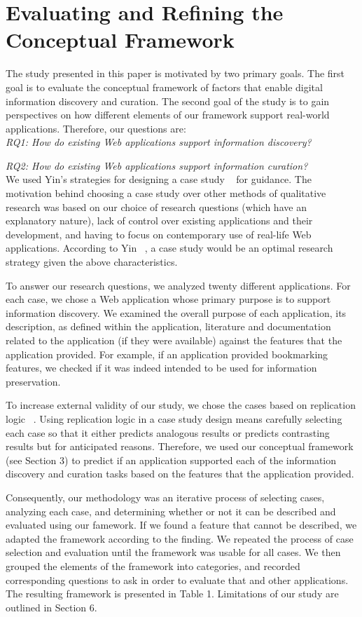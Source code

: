 \documentclass{casconpaper}
\begin{document}
{\section{Evaluating and Refining the Conceptual Framework}
The study presented in this paper is motivated by two primary goals. The first goal is to evaluate the conceptual framework of factors that enable digital information discovery and curation. The second goal of the study is to gain perspectives on how different elements of our framework support real-world applications. Therefore, our questions are:
\\

\emph{RQ1: How do existing Web applications support information discovery?}

\emph{RQ2: How do existing Web applications support information curation?}\\


We used Yin’s strategies for designing a case study ~\cite{yin} for guidance. The motivation behind choosing a case study over other methods of qualitative research was based on our choice of research questions (which have an explanatory nature), lack of control over existing applications and their development, and having to focus on contemporary use of real-life Web applications. According to Yin ~\cite{yin}, a case study would be an optimal research strategy given the above characteristics.

To answer our research questions, we analyzed twenty different applications. For each case, we chose a Web application whose primary purpose is to support information discovery. We examined the overall purpose of each application, its description, as defined within the application, literature and documentation related to the application (if they were available) against the features that the application provided. For example, if an application provided bookmarking features, we checked if it was indeed intended to be used for information preservation. 

To increase external validity of our study, we chose the cases based on replication logic ~\cite{yin}. Using replication logic in a case study design means carefully selecting each case so that it either predicts analogous results or predicts contrasting results but for anticipated reasons. Therefore, we used our conceptual framework (see Section 3) to predict if an application supported each of the information discovery and curation tasks based on the features that the application provided. 

Consequently, our methodology was an iterative process of selecting cases, analyzing each case, and determining whether or not it can be described and evaluated using our famework. If we found a feature that cannot be described, we adapted the framework according to the finding. We repeated the process of case selection and evaluation until the framework was usable for all cases. We then grouped the elements of the framework into categories, and recorded corresponding questions to ask in order to evaluate that and other applications. The resulting framework is presented in Table 1. Limitations of our study are outlined in Section 6.
} %
\end{document}
